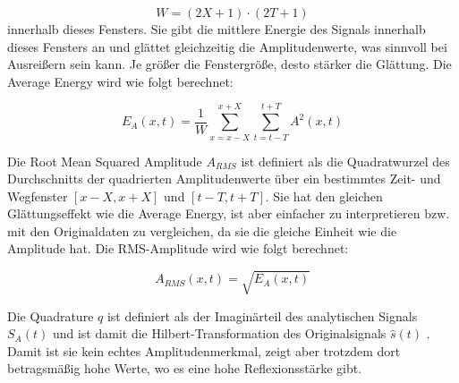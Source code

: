 \begin{equation}
    W = (2X+1) \cdot (2T+1)
    \label{eq:window_counts}
\end{equation}
\noindent innerhalb dieses Fensters. Sie gibt die mittlere Energie des Signals innerhalb dieses Fensters an und glättet gleichzeitig die Amplitudenwerte, was sinnvoll bei Ausreißern sein kann. Je größer die Fenstergröße, desto stärker die Glättung. Die Average Energy wird wie folgt berechnet:

\begin{equation}
    E_A(x,t) = \frac{1}{W} \sum_{x=x-X}^{x+X} \sum_{t=t-T}^{t+T} A^2(x,t)
\end{equation}


\noindent Die Root Mean Squared Amplitude $A_{RMS}$ \parencites{roden_geologic_2015}{seg_wiki_rms_2022} ist definiert als die Quadratwurzel des Durchschnitts der quadrierten Amplitudenwerte über ein bestimmtes Zeit- und Wegfenster $\left[x-X, x+X\right]$ und $\left[t-T, t+T\right]$. Sie hat den gleichen Glättungseffekt wie die Average Energy, ist aber einfacher zu interpretieren bzw. mit den Originaldaten zu vergleichen, da sie die gleiche Einheit wie die Amplitude hat. Die RMS-Amplitude wird wie folgt berechnet:

\begin{equation}
    A_{RMS}(x,t) = \sqrt{E_A(x,t)}
\end{equation}


\noindent Die Quadrature $q$ \parencite{taner_complex_1979} ist definiert als der Imaginärteil des analytischen Signals $S_A(t)$ und ist damit die Hilbert-Transformation des Originalsignals $\hat{s}(t)$ \parencite[S. 177]{sheriff_encyclopedic_2002}. Damit ist sie kein echtes Amplitudenmerkmal, zeigt aber trotzdem dort betragsmäßig hohe Werte, wo es eine hohe Reflexionsstärke gibt.

